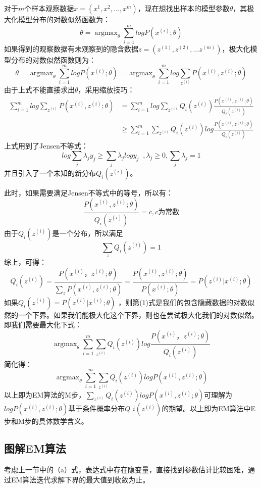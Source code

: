 ​
对于$m$个样本观察数据$x=(x^{1},x^{2},...,x^{m})$，现在想找出样本的模型参数$\theta$，其极大化模型分布的对数似然函数为：
\[
\theta = \mathop{\arg\max}_\theta\sum\limits_{i=1}^m logP(x^{(i)};\theta)
\]
如果得到的观察数据有未观察到的隐含数据$z=(z^{(1)},z^{(2)},...z^{(m)})$，极大化模型分布的对数似然函数则为：
\[
\theta =\mathop{\arg\max}_\theta\sum\limits_{i=1}^m logP(x^{(i)};\theta) = \mathop{\arg\max}_\theta\sum\limits_{i=1}^m log\sum\limits_{z^{(i)}}P(x^{(i)}, z^{(i)};\theta)  \tag{a}
\] 由于上式不能直接求出$\theta$，采用缩放技巧： \[
\begin{align} \sum\limits_{i=1}^m log\sum\limits_{z^{(i)}}P(x^{(i)}, z^{(i)};\theta)   & = \sum\limits_{i=1}^m log\sum\limits_{z^{(i)}}Q_i(z^{(i)})\frac{P(x^{(i)}, z^{(i)};\theta)}{Q_i(z^{(i)})} \\ & \geqslant  \sum\limits_{i=1}^m \sum\limits_{z^{(i)}}Q_i(z^{(i)})log\frac{P(x^{(i)}, z^{(i)};\theta)}{Q_i(z^{(i)})} \end{align}   \tag{1}
\] 上式用到了Jensen不等式： \[
log\sum\limits_j\lambda_jy_j \geqslant \sum\limits_j\lambda_jlogy_j\;\;,  \lambda_j \geqslant 0, \sum\limits_j\lambda_j =1
\] 并且引入了一个未知的新分布$Q_i(z^{(i)})$。

此时，如果需要满足Jensen不等式中的等号，所以有： \[
\frac{P(x^{(i)}, z^{(i)};\theta)}{Q_i(z^{(i)})} =c, c为常数
\] 由于$Q_i(z^{(i)})$是一个分布，所以满足 \[
\sum\limits_{z}Q_i(z^{(i)}) =1
\] 综上，可得： \[
Q_i(z^{(i)})  = \frac{P(x^{(i)}， z^{(i)};\theta)}{\sum\limits_{z}P(x^{(i)}, z^{(i)};\theta)} =  \frac{P(x^{(i)}, z^{(i)};\theta)}{P(x^{(i)};\theta)} = P( z^{(i)}|x^{(i)};\theta)
\] 如果$Q_i(z^{(i)}) = P( z^{(i)}|x^{(i)};\theta)$
，则第(1)式是我们的包含隐藏数据的对数似然的一个下界。如果我们能极大化这个下界，则也在尝试极大化我们的对数似然。即我们需要最大化下式：
\[
\mathop{\arg\max}_\theta \sum\limits_{i=1}^m \sum\limits_{z^{(i)}}Q_i(z^{(i)})log\frac{P(x^{(i)}， z^{(i)};\theta)}{Q_i(z^{(i)})}
\] 简化得： \[
\mathop{\arg\max}_\theta \sum\limits_{i=1}^m \sum\limits_{z^{(i)}}Q_i(z^{(i)})log{P(x^{(i)}, z^{(i)};\theta)}
\]
以上即为EM算法的M步，$\sum\limits_{z^{(i)}}Q_i(z^{(i)})log{P(x^{(i)}, z^{(i)};\theta)}​$可理解为$logP(x^{(i)},
z^{(i)};\theta) $基于条件概率分布$Q\_i(z^{(i)})
$的期望。以上即为EM算法中E步和M步的具体数学含义。

\subsection{ 图解EM算法}\label{ux56feux89e3emux7b97ux6cd5}

​
考虑上一节中的（a）式，表达式中存在隐变量，直接找到参数估计比较困难，通过EM算法迭代求解下界的最大值到收敛为止。

